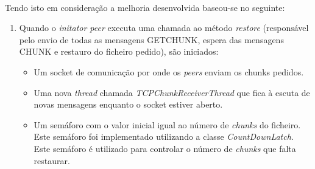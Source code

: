 \documentclass[11pt,oneside]{book}
\begin{document}
\paragraph{}
    Tendo isto em consideração a melhoria desenvolvida baseou-se no seguinte:
    \begin{enumerate}
        \item Quando o \textit{initator peer} executa uma chamada ao método
        \textit{restore} (responsável pelo envio de todas as mensagens GETCHUNK,
        espera das mensagens CHUNK e restauro do ficheiro pedido), são iniciados:
        \begin{itemize}
            \item Um socket de comunicação por onde os \textit{peers} enviam os
            chunks pedidos.
            \item Uma nova \textit{thread} chamada \textit{TCPChunkReceiverThread}
            que fica à escuta de novas mensagens enquanto o socket estiver
            aberto.
            \item Um semáforo com o valor inicial igual ao número de \textit{chunks}
            do ficheiro. Este semáforo foi implementado utilizando a classe
            \textit{CountDownLatch}. Este semáforo é utilizado para controlar
            o número de \textit{chunks} que falta restaurar.
        \end{itemize}

\end{enumerate}
\end{document}
